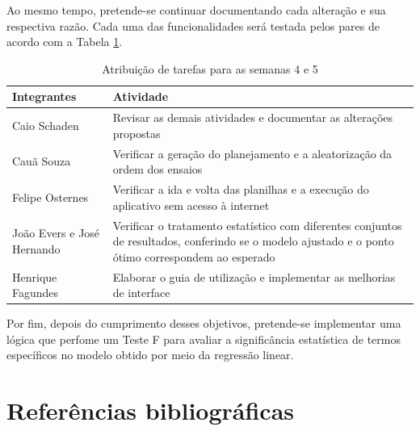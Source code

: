 \documentclass[12pt]{article}
\begin{document}
Ao mesmo tempo, pretende-se continuar documentando cada alteração e sua respectiva razão. Cada uma das funcionalidades será testada pelos pares de acordo com a Tabela \ref{tab:tarefas}.

\begin{table}[H]
	\centering
	\caption{Atribuição de tarefas para as semanas 4 e 5}
	\begin{tabular}{l p{8.4cm}}
		\toprule
		\textbf{Integrantes} & \textbf{Atividade}                                                                                                                          \\
		\midrule
		Caio Schaden                 & Revisar as demais atividades e documentar as alterações propostas                                                                    \\
		Cauã Souza                   & Verificar a geração do planejamento e a aleatorização da ordem dos ensaios                                                           \\
		Felipe Osternes              & Verificar a ida e volta das planilhas e a execução do aplicativo sem acesso à internet                                               \\
		João Evers e José Hernando   & Verificar o tratamento estatístico com diferentes conjuntos de resultados, conferindo se o modelo ajustado e o ponto ótimo correspondem ao esperado \\
		Henrique Fagundes            & Elaborar o guia de utilização e implementar as melhorias de interface                                                                \\
		\bottomrule
	\end{tabular}
	\label{tab:tarefas}
\end{table}

Por fim, depois do cumprimento desses objetivos, pretende-se implementar uma lógica que perfome um Teste F para avaliar a significância estatística de termos específicos no modelo obtido por meio da regressão linear.

\newpage

\section*{Referências bibliográficas}
\begingroup
\renewcommand{\section}[2]{}

\endgroup
\end{document}

